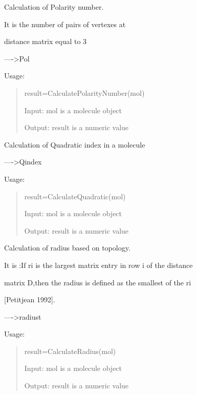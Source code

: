 \documentclass[letterpaper,10pt,english]{sphinxmanual}
\begin{document}

\begin{fulllineitems}
\label{reference/topology:topology.CalculatePolarityNumber}
Calculation of Polarity number.

It is the number of pairs of vertexes at

distance matrix equal to 3

----\textgreater{}Pol

Usage:
\begin{quote}

result=CalculatePolarityNumber(mol)

Input: mol is a molecule object

Output: result is a numeric value
\end{quote}

\end{fulllineitems}


\begin{fulllineitems}
\label{reference/topology:topology.CalculateQuadratic}
Calculation of Quadratic index in a molecule

----\textgreater{}Qindex

Usage:
\begin{quote}

result=CalculateQuadratic(mol)

Input: mol is a molecule object

Output: result is a numeric value
\end{quote}

\end{fulllineitems}


\begin{fulllineitems}
\label{reference/topology:topology.CalculateRadius}
Calculation of radius based on topology.

It is :If ri is the largest matrix entry in row i of the distance

matrix D,then the radius is defined as the smallest of the ri

{[}Petitjean 1992{]}.

----\textgreater{}radiust

Usage:
\begin{quote}

result=CalculateRadius(mol)

Input: mol is a molecule object

Output: result is a numeric value
\end{quote}

\end{fulllineitems}
\end{document}

